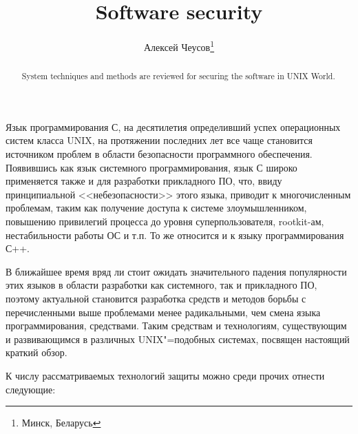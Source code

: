 \documentclass[10pt, a5paper]{article}
\begin{document}
\title{Software security}%

\author{Алексей Чеусов\footnote{Минск, Беларусь}}
\maketitle

\begin{abstract}
System techniques and methods are reviewed for securing the software in UNIX World.
\end{abstract}

Язык программирования С, на десятилетия определивший успех операционных систем класса UNIX, на протяжении последних лет все чаще
становится источником проблем в области безопасности программного
обеспечения. Появившись как язык системного программирования, язык С
широко применяется также и для разработки прикладного ПО, что, ввиду принципиальной <<небезопасности>> этого языка, приводит к многочисленным проблемам, таким как получение доступа к системе злоумышленником, повышению привилегий процесса до уровня суперпользователя, rootkit-ам, нестабильности работы ОС и т.п. То же относится и к языку программирования С++.

В ближайшее время вряд ли стоит ожидать значительного падения популярности этих языков в области разработки как системного, так и прикладного ПО, поэтому
актуальной становится разработка средств и методов борьбы с
перечисленными выше проблемами менее радикальными, чем смена языка
программирования, средствами. Таким средствам и технологиям, существующим и развивающимся в различных UNIX"=подобных системах, посвящен настоящий краткий обзор.

К числу рассматриваемых технологий защиты можно среди прочих отнести следующие:
\end{document}

